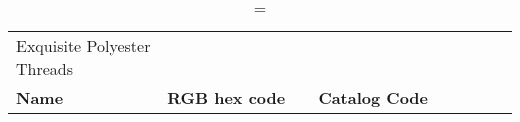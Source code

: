 
\begin{longtable}{p{0.3\linewidth} p{0.3\linewidth} p{0.4\linewidth}}
\caption = {Exquisite Polyester Threads}
\label{tblr:exquisite}\\
\textbf{Name} & \textbf{RGB hex code} & \textbf{Catalog Code} \\

\end{longtable}
